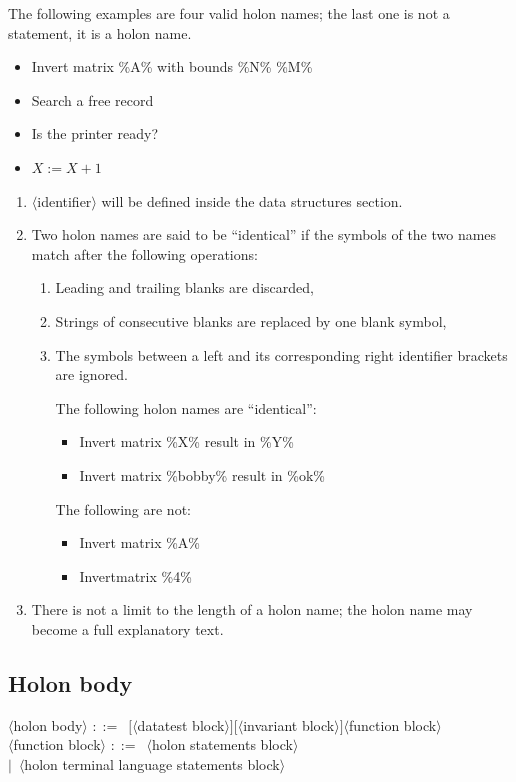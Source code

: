 \documentclass[openany,nobib]{tufte-book}
\newcommand{\sym}[1]{$\langle$#1$\rangle$}
\def\is{$::=$\ }
\def\alt{$|$\ }
\begin{document}
The following examples are four valid holon names; the last one is not a
statement, it is a holon name.
\begin{itemize}
    \item Invert matrix \%A\% with bounds \%N\% \%M\%
    \item Search a free record
    \item Is the printer ready?
    \item $X := X+1$
\end{itemize}

\begin{enumerate}
    \item \sym{identifier} will be defined inside the data structures section.
    \item Two holon names are said to be ``identical'' if the symbols of the
two names match after the following operations:
    \begin{enumerate}
        \item Leading and trailing blanks are discarded,
        \item Strings of consecutive blanks are replaced by one blank symbol,
        \item The symbols between a left and its corresponding right identifier
brackets are ignored.

    The following holon names are ``identical'':
    \begin{itemize}
        \item Invert matrix \%X\% result in \%Y\%
        \item Invert matrix \%bobby\% result in \%ok\%
    \end{itemize}
    The following are not:
    \begin{itemize}
        \item Invert matrix \%A\%
        \item Invertmatrix \%4\%
    \end{itemize}
    \end{enumerate}
    \item There is not a limit to the length of a holon name; the holon name
may become a full explanatory text.
\end{enumerate}
\clearpage
\subsection{Holon body}

\begin{tcolorbox}
\sym{holon body} \is $[$\sym{datatest block}$]$$[$\sym{invariant
block}$]$\sym{function block}\\
\sym{function block} \is \sym{holon statements block}\\
\qquad\alt\sym{holon terminal language statements block}
\end{tcolorbox}
\end{document}
